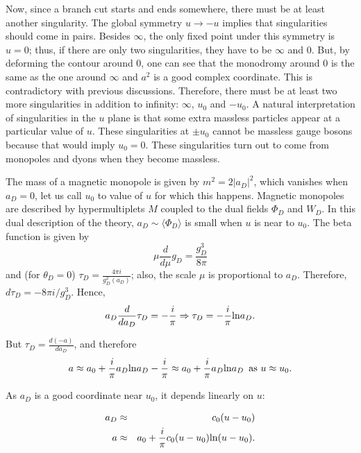 \documentclass[12pt, onecolumn]{article}
\begin{document}
Now,  since a branch cut starts and ends somewhere, there must be at least another singularity. The global symmetry $u\rightarrow -u$ implies that singularities should come in pairs. Besides $\infty$, the only fixed point under this symmetry is $u=0$; thus, if there are only two singularities, they have to be $\infty$ and $0$.  But, by deforming the contour around 0, one can see that the monodromy around 0 is the same as the one around $\infty$ and $a^2$ is a good complex coordinate. This is contradictory with previous discussions. Therefore, there must be at least two more singularities in addition to infinity: $\infty$, $u_0$ and $-u_0$.  A natural interpretation of singularities in the $u$ plane is that some extra massless particles appear at a particular value of $u$. These singularities at $\pm u_0$ cannot be massless gauge bosons because that would imply $u_0=0$. These singularities turn out to come from monopoles and dyons when they become massless. 

The mass of a magnetic monopole is given by $m^2=2 |a_D|^2$, which vanishes when $a_D=0$, let us call $u_0$ to value of $u$ for which this happens. Magnetic monopoles are described by hypermultiplets $M$ coupled to the dual fields $\Phi_D$ and $W_D$. In this dual description of the theory, $a_D\sim \langle \Phi_D\rangle$ is small when $u$ is near to $u_0$. The beta function is given by
\begin{equation}
\mu \frac{d}{d\mu}g_D = \frac{g_D^3}{8\pi}
\end{equation} and (for $\theta_D=0$) $\tau_D = \frac{4\pi i}{g_D^2(a_D)}$; also, the scale $\mu$ is proportional to $a_D$. Therefore, $d\tau_D = -8\pi i /g_D^3$. Hence, 
\begin{equation} 
a_D \frac{d}{da_D}\tau_D=-\frac{i}{\pi}\Rightarrow \tau_D=-\frac{i}{\pi}{\rm ln} a_D.
\end{equation}

But $\tau_D=\frac{d(-a)}{da_D}$, and therefore 
\begin{equation}
a \approx a_0+ \frac{i}{\pi}a_D {\rm ln}a_D -\frac{i}{\pi}\approx  a_0+ \frac{i}{\pi}a_D {\rm ln}a_D \,\,\,{\rm as} \,\,u\approx u_0.
\end{equation}

As $a_D$ is a good coordinate near $u_0$, it depends linearly on $u$:

\begin{eqnarray}
a_D&\approx & c_0(u-u_0) \nonumber \\
a & \approx & a_0 +\frac{i}{\pi}c_0(u-u_0) {\rm ln}(u-u_0).
\end{eqnarray}
\end{document}

